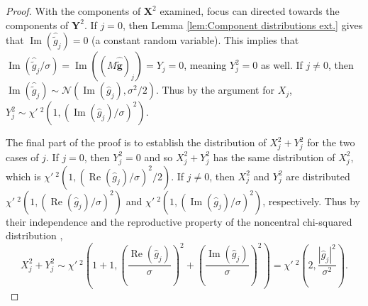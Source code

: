 \documentclass[12pt]{article}
\newcommand{\gnoise}{\widetilde{g}}	%
\newcommand{\gnoiseVec}{\widetilde{\mathbf{g}}}	%
\newcommand{\noiseSD}{\sigma}	%
\renewcommand{\Re}{\operatorname{Re}}	%
\renewcommand{\Im}{\operatorname{Im}}	%
\newcommand{\NCchi}{\chi'\:}	%
\begin{document}
\begin{proof}
With the components of $\bm{X}^2$ examined, focus can directed towards the components of $\bm{Y}^2$. If $j = 0$, then Lemma \ref{lem:Component distributions ext.} gives that $\Im(\widehat{\gnoise}_j) = 0$ (a constant random variable). This implies that $\Im(\widehat{\gnoise}_j/\noiseSD) = \Im((M\widehat{\gnoiseVec})_j) = Y_j = 0$, meaning $Y_j^2 = 0$ as well. If $j \neq 0$, then $\Im(\widehat{\gnoise}_j) \sim \mathcal{N}(\Im(\widehat{g}_j),\noiseSD^2/2)$. Thus by the argument for $X_j$, $Y_j^2 \sim \NCchi^2(1,(\Im(\widehat{g}_j)/\noiseSD)^2)$. \par 
The final part of the proof is to establish the distribution of $X_j^2 + Y_j^2$ for the two cases of $j$. If $j = 0$, then $Y_j^2 = 0$ and so $X_j^2 + Y_j^2$ has the same distribution of $X_j^2$, which is $\NCchi^2(1,(\Re(\widehat{g}_j)/\noiseSD)^2/2)$. If $j \neq 0$, then $X_j^2$ and $Y_j^2$ are distributed $\NCchi^2(1,(\Re(\widehat{g}_j)/\noiseSD)^2)$ and $\NCchi^2(1,(\Im(\widehat{g}_j)/\noiseSD)^2)$, respectively. Thus by their independence and the reproductive property of the noncentral chi-squared distribution \cite[p.~182]{Rao1973},
\[X_j^2 + Y_j^2 \sim \NCchi^2\left(1 + 1,\left(\frac{\Re(\widehat{g}_j)}{\noiseSD}\right)^2 + \left(\frac{\Im(\widehat{g}_j)}{\noiseSD}\right)^2\right) = \NCchi^2\left(2,\frac{|\widehat{g}_j|^2}{\noiseSD^2}\right).\]
\end{proof}
\end{document}
